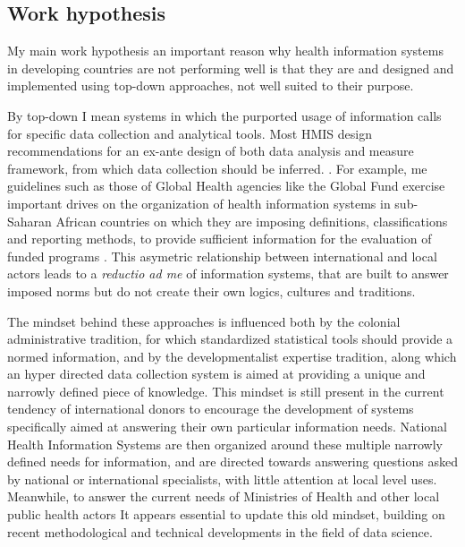 \subsection{Work hypothesis}

My main work hypothesis an important reason why health information systems in developing countries are not performing well is that they are and designed and implemented using top-down approaches, not well suited to their purpose.

By top-down I mean systems in which the purported usage of information calls for specific data collection and analytical tools. Most HMIS design recommendations for an ex-ante design of both data analysis and measure framework, from which data collection should be inferred. \citep{lippeveld_routine_2000,rhino_introducing_2003,daltilia_systeme_2005,health_metrics_network_framework_2008}. For example, \gls{me} guidelines such as those of Global Health agencies like the Global Fund exercise important drives on the organization of health information systems in sub-Saharan African countries on which they are imposing definitions, classifications and reporting methods, to provide sufficient information for the evaluation of funded programs \citep{the_global_fund_global_2014}. This asymetric relationship between international and local actors leads to a    \textit{reductio ad \gls{me}} of information systems, that are built to answer imposed norms but do not create their own logics, cultures and traditions.

The mindset behind these approaches is influenced both by the colonial administrative tradition, for which standardized statistical tools should provide a normed information, and by the developmentalist expertise tradition, along which an hyper directed data collection system is aimed at providing a unique and narrowly defined piece of knowledge. This mindset is still present in the current tendency of international donors to encourage the development of systems specifically aimed at answering their own particular information needs. National Health Information Systems are then organized around these multiple narrowly defined needs for information, and are directed towards answering questions asked by national or international specialists, with little attention at local level uses. Meanwhile, to answer the current needs of Ministries of Health and other local public health actors It appears essential to update this old mindset, building on recent methodological and technical developments in the field of data science.

